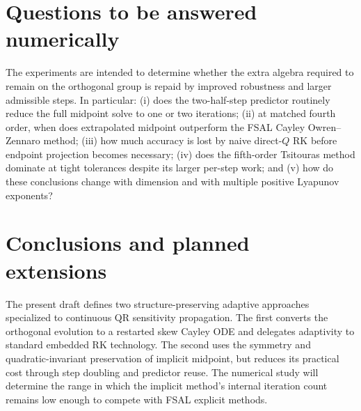 \documentclass[11pt]{article}
\begin{document}
\section{Questions to be answered numerically}
The experiments are intended to determine whether the extra algebra required to remain on the orthogonal group is repaid by improved robustness and larger admissible steps. In particular: (i) does the two-half-step predictor routinely reduce the full midpoint solve to one or two iterations; (ii) at matched fourth order, when does extrapolated midpoint outperform the FSAL Cayley Owren--Zennaro method; (iii) how much accuracy is lost by naive direct-$Q$ RK before endpoint projection becomes necessary; (iv) does the fifth-order Tsitouras method dominate at tight tolerances despite its larger per-step work; and (v) how do these conclusions change with dimension and with multiple positive Lyapunov exponents?

\section{Conclusions and planned extensions}
The present draft defines two structure-preserving adaptive approaches specialized to continuous QR sensitivity propagation. The first converts the orthogonal evolution to a restarted skew Cayley ODE and delegates adaptivity to standard embedded RK technology. The second uses the symmetry and quadratic-invariant preservation of implicit midpoint, but reduces its practical cost through step doubling and predictor reuse. The numerical study will determine the range in which the implicit method's internal iteration count remains low enough to compete with FSAL explicit methods.



\end{document}

